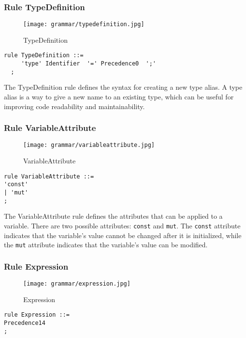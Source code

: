 \subsubsection*{Rule TypeDefinition}

\begin{figure}[!ht]
\centering
\texttt{[image: grammar/typedefinition.jpg]}
\caption{TypeDefinition}
\end{figure}

\begin{lstlisting}
rule TypeDefinition ::=
     'type' Identifier  '=' Precedence0  ';' 
  ;
\end{lstlisting}

The TypeDefinition rule defines the syntax for creating a new type alias. A type alias is a way to give a new name to an existing type, which can be useful for improving code readability and maintainability.

\subsubsection*{Rule VariableAttribute}

\begin{figure}[!ht]
\centering
\texttt{[image: grammar/variableattribute.jpg]}
\caption{VariableAttribute}
\end{figure}

\begin{lstlisting}
rule VariableAttribute ::=
'const'
| 'mut'
;
\end{lstlisting}

The VariableAttribute rule defines the attributes that can be applied to a variable. There are two possible attributes: \verb|const| and \verb|mut|. The \verb|const| attribute indicates that the variable's value cannot be changed after it is initialized, while the \verb|mut| attribute indicates that the variable's value can be modified.

\subsubsection*{Rule Expression}

\begin{figure}[!ht]
\centering
\texttt{[image: grammar/expression.jpg]}
\caption{Expression}
\end{figure}

\begin{lstlisting}
rule Expression ::=
Precedence14
;
\end{lstlisting}

